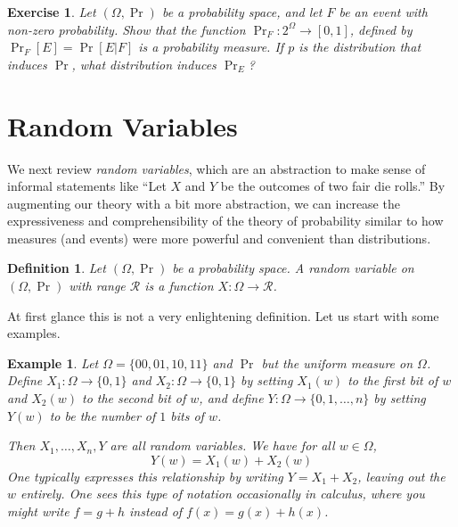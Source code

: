 \documentclass[11pt]{article}
\newtheorem{exercise}{Exercise}
\newtheorem{definition}{Definition}
\newtheorem{example}{Example}
\newcommand{\bits}{\{0,1\}}
\newcommand{\rvrange}{\mathcal{R}}
\begin{document}
\begin{exercise}
    Let $(\Omega,\Pr)$ be a probability space, and let $F$ be an event
    with non-zero probability. Show that the function $\Pr_F:2^\Omega\to[0,1]$,
    defined by $\Pr_F[E] = \Pr[E|F]$ is a probability measure. If $p$
    is the distribution that induces $\Pr$, what distribution induces
    $\Pr_E$?
\end{exercise}


\section{Random Variables}

We next review \emph{random variables}, which are an abstraction to make sense
of informal statements like ``Let $X$ and $Y$ be the outcomes of two fair die
rolls.'' By augmenting our theory with a bit more abstraction, we can increase
the expressiveness and comprehensibility of the theory of probability similar
to how measures (and events) were more powerful and convenient than
distributions.

\begin{definition}
    Let $(\Omega,\Pr)$ be a probability space. A random variable on $(\Omega,\Pr)$ with range $\rvrange$ is a function $X:\Omega\to\rvrange$.
\end{definition}
At first glance this is not a very enlightening definition. Let us
start with some examples.
\iffalse
\begin{example}
    Let $\Omega=\bits^n$ and $\Pr$ but the uniform measure. Define
    $X_i:\Omega \to \bits$ by setting $X_i(w)$ to 
    the $i$-th bit of $w$, and define $Y:\Omega\to\{0,1,\ldots,n\}$
    by setting $Y(w)$ to be the number of $1$ bits of $w$.
    Then $X_1,\ldots,X_n,Y$ are all random variables.
    We have for all $w\in\Omega$,
    \[
        Y(w) = \sum_{i=1}^n X_i(w).
    \]
    One typically expresses this relationship by writing 
    $Y = \sum_{i=1}^n X_i$, leaving out the $w$ entirely. One sees this
    type of notation occasionally in calculus, where you might write 
    $f = g+h$ instead of $f(x) = g(x) + h(x)$.
\end{example}
\fi
\begin{example}
    Let $\Omega=\{00,01,10,11\}$ and $\Pr$ but the uniform measure on $\Omega$. 
    Define $X_1:\Omega \to \bits$ and $X_2:\Omega \to \bits$
    by setting $X_1(w)$ to the first bit of $w$ and $X_2(w)$ to the second
    bit of $w$,
    and define $Y:\Omega\to\{0,1,\ldots,n\}$
    by setting $Y(w)$ to be the number of $1$ bits of $w$.

    Then $X_1,\ldots,X_n,Y$ are all random variables.
    We have for all $w\in\Omega$,
    \[
        Y(w) = X_1(w) + X_2(w)
    \]
    One typically expresses this relationship by writing 
    $Y = X_1+X_2$, leaving out the $w$ entirely. One sees this
    type of notation occasionally in calculus, where you might write 
    $f = g+h$ instead of $f(x) = g(x) + h(x)$.
\end{example}
\end{document}
